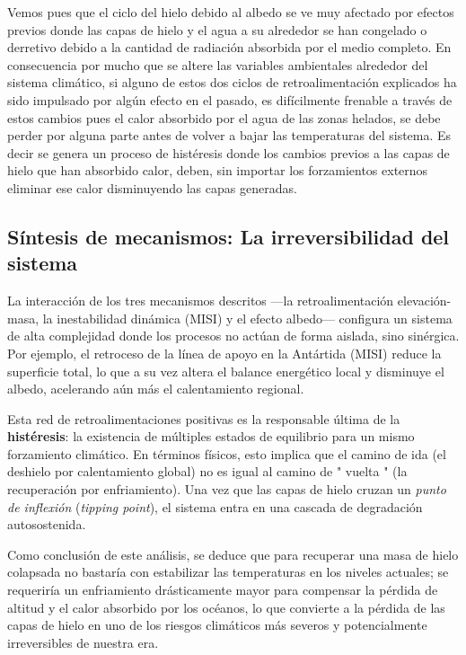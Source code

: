 \documentclass[12pt,a4paper,chapterprefix=false,headings=twolinechapter]{scrreprt}
\begin{document}
\newpage

Vemos pues que el ciclo del hielo debido al albedo se ve muy afectado por efectos previos donde las capas de hielo y el agua a su alrededor se han congelado o derretivo debido a la cantidad de radiación absorbida por el medio completo. En consecuencia por mucho que se altere 
las variables ambientales alrededor del sistema climático, si alguno de estos dos ciclos de retroalimentación explicados ha sido impulsado por algún efecto en el pasado, es difícilmente frenable a través de estos cambios pues el calor absorbido por el agua de las zonas helados, se debe 
perder por alguna parte antes de volver a bajar las temperaturas del sistema. Es decir se genera un proceso de histéresis donde los cambios previos a las capas de hielo que han absorbido calor, deben, sin importar los forzamientos externos eliminar ese calor disminuyendo las capas generadas.

\subsection{Síntesis de mecanismos: La irreversibilidad del sistema}

La interacción de los tres mecanismos descritos —la retroalimentación elevación-masa, la inestabilidad dinámica (MISI) y el efecto albedo— configura un sistema de alta complejidad donde los procesos no actúan de forma aislada, sino sinérgica. Por ejemplo, el retroceso de la línea de apoyo en la Antártida (MISI) reduce la superficie total, lo que a su vez altera el balance energético local y disminuye el albedo, acelerando aún más el calentamiento regional.

Esta red de retroalimentaciones positivas es la responsable última de la \textbf{histéresis}: la existencia de múltiples estados de equilibrio para un mismo forzamiento climático. En términos físicos, esto implica que el camino de ida (el deshielo por calentamiento global) no es igual al camino de " vuelta " (la recuperación por enfriamiento). Una vez que las capas de hielo cruzan un \textit{punto de inflexión} (\textit{tipping point}), el sistema entra en una cascada de degradación autosostenida. 

Como conclusión de este análisis, se deduce que para recuperar una masa de hielo colapsada no bastaría con estabilizar las temperaturas en los niveles actuales; se requeriría un enfriamiento drásticamente mayor para compensar la pérdida de altitud y el calor absorbido por los océanos, lo que convierte a la pérdida de las capas de hielo en uno de los riesgos climáticos más severos y potencialmente irreversibles de nuestra era.
\end{document}
